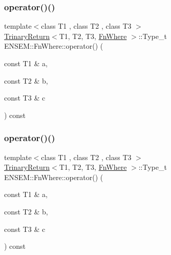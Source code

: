 \subsubsection{\texorpdfstring{operator()()}{operator()()}\hspace{0.1cm}{\footnotesize\ttfamily [1/3]}}
{\footnotesize\ttfamily template$<$class T1 , class T2 , class T3 $>$ \\
\mbox{\hyperlink{structENSEM_1_1TrinaryReturn}{Trinary\+Return}}$<$T1, T2, T3, \mbox{\hyperlink{structENSEM_1_1FnWhere}{Fn\+Where}} $>$\+::Type\+\_\+t E\+N\+S\+E\+M\+::\+Fn\+Where\+::operator() (\begin{DoxyParamCaption}\item[{const T1 \&}]{a,  }\item[{const T2 \&}]{b,  }\item[{const T3 \&}]{c }\end{DoxyParamCaption}) const\hspace{0.3cm}{\ttfamily [inline]}}

\mbox{\label{structENSEM_1_1FnWhere_a8aeb5ef42051b473191ace0a8ae74304}} 
\subsubsection{\texorpdfstring{operator()()}{operator()()}\hspace{0.1cm}{\footnotesize\ttfamily [2/3]}}
{\footnotesize\ttfamily template$<$class T1 , class T2 , class T3 $>$ \\
\mbox{\hyperlink{structENSEM_1_1TrinaryReturn}{Trinary\+Return}}$<$T1, T2, T3, \mbox{\hyperlink{structENSEM_1_1FnWhere}{Fn\+Where}} $>$\+::Type\+\_\+t E\+N\+S\+E\+M\+::\+Fn\+Where\+::operator() (\begin{DoxyParamCaption}\item[{const T1 \&}]{a,  }\item[{const T2 \&}]{b,  }\item[{const T3 \&}]{c }\end{DoxyParamCaption}) const\hspace{0.3cm}{\ttfamily [inline]}}

\mbox{\label{structENSEM_1_1FnWhere_a8aeb5ef42051b473191ace0a8ae74304}} 
